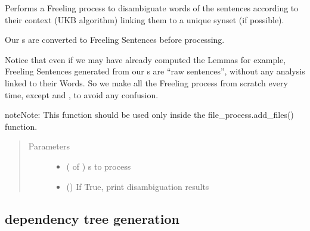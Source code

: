 \documentclass[letterpaper,10pt,english]{sphinxmanual}
\begin{document}
\begin{fulllineitems}
\label{\detokenize{process:loacore.process.synset_process.add_synsets_to_sentences}}
Performs a Freeling process to disambiguate words of the sentences according to their context
(UKB algorithm) linking them to a unique synset (if possible).

Our  s are converted to Freeling Sentences before processing.

Notice that even if we may have already computed the Lemmas for example, Freeling Sentences generated from our
 s are “raw sentences”, without any analysis linked to their Words. So we make all the Freeling
process from scratch every time, except  and , to avoid any confusion.

\begin{sphinxadmonition}{note}{Note:}
This function should be used only inside the file\_process.add\_files() function.
\end{sphinxadmonition}
\begin{quote}\begin{description}
\item[{Parameters}] \leavevmode\begin{itemize}
\item {} 
 ( of ) \textendash{}  s to process

\item {} 
 () \textendash{} If True, print disambiguation results

\end{itemize}

\end{description}\end{quote}

\end{fulllineitems}



\subsection{dependency tree generation}
\label{\detokenize{process:module-loacore.process.deptree_process}}\label{\detokenize{process:dependency-tree-generation}}
\end{document}
